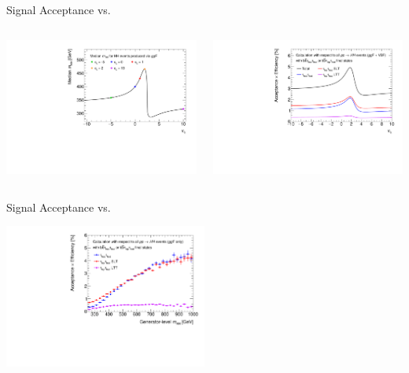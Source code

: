 \documentclass[11pt, xcolor={dvipsnames}, aspectratio=169, notes]{beamer}
\begin{document}
\begin{frame}{Signal Acceptance vs.\ \allbold{\klambda}}
  \begin{columns}
    \includegraphics[width=\textwidth]{self_coupling/hh_median_mhh_vs_klam}\hfill%

    \includegraphics[width=\textwidth]{self_coupling/acc_vs_klam}
  \end{columns}
\end{frame}


\begin{frame}{Signal Acceptance vs.\ \allbold{\mHH}}
  \begin{center}
    \includegraphics[width=0.5\textwidth]{self_coupling/acc_vs_mhh}
  \end{center}
\end{frame}
\end{document}
